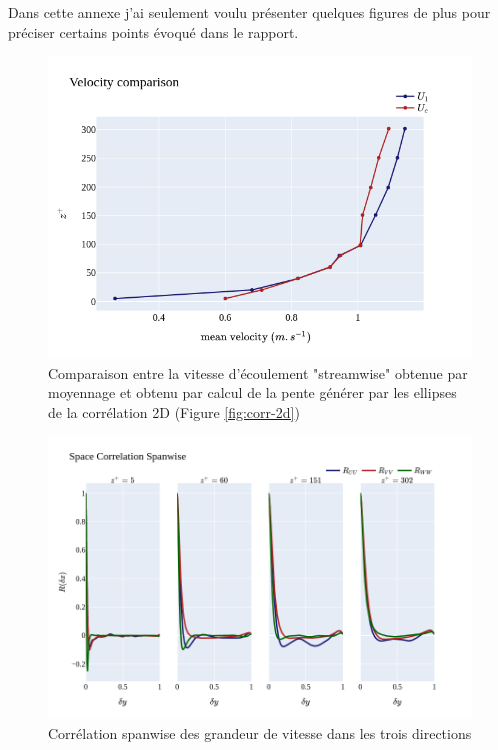 \documentclass[12pt]{article}
\theoremstyle{plain}
\theoremstyle{remark}
\begin{document}
Dans cette annexe j'ai seulement voulu présenter quelques figures de plus pour préciser certains points évoqué dans le rapport.

\begin{figure}[H]
	\begin{center}
		\includegraphics[width=0.8\linewidth]{../../output/figures/channel_wrles_retau395/split_time/frozen_turbulence/correlation2D/u_1c_all.png}
		\caption{Comparaison entre la vitesse d'écoulement "streamwise" obtenue par moyennage et obtenu par calcul de la pente générer par les ellipses de la corrélation 2D (Figure \ref{fig:corr-2d})}
		\label{fig:comp_u1_uc}
	\end{center}
\end{figure}

\begin{figure}[H]
	\begin{center}
		\includegraphics[width=0.9\linewidth]{../../output/figures/channel_wrles_retau395/split_time/space_correlation/spanwise.png}
		\caption{Corrélation spanwise des grandeur de vitesse dans les trois directions}
		\label{fig:space_spectra_spanwise}
	\end{center}
\end{figure}
\end{document}
